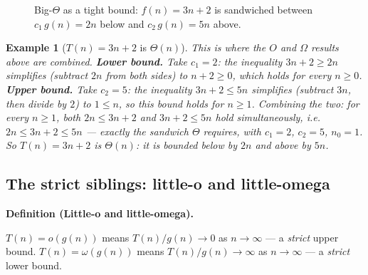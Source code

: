 \documentclass[11pt]{article}
\newtheorem{example}{Example}[section]
\newenvironment{definitionbox}[1]{%
  \par\noindent\textbf{Definition (#1).}\ \itshape
}{\par\vspace{0.3em}}
\begin{document}
\begin{figure}[h]
  \centering
  \caption{Big-$\Theta$ as a tight bound: $f(n)=3n+2$ is sandwiched between
  $c_1\,g(n)=2n$ below and $c_2\,g(n)=5n$ above.}
  \label{fig:bigtheta}
\end{figure}

\begin{example}[$T(n) = 3n + 2$ is $\Theta(n)$]
This is where the $O$ and $\Omega$ results above are combined. \textbf{Lower
bound.} Take $c_1 = 2$: the inequality $3n + 2 \geq 2n$ simplifies (subtract
$2n$ from both sides) to $n + 2 \geq 0$, which holds for every $n \geq 0$.
\textbf{Upper bound.} Take $c_2 = 5$: the inequality $3n + 2 \leq 5n$
simplifies (subtract $3n$, then divide by $2$) to $1 \leq n$, so this bound
holds for $n \geq 1$. Combining the two: for every $n \geq 1$, both
$2n \leq 3n + 2$ and $3n + 2 \leq 5n$ hold simultaneously, i.e.\
$2n \leq 3n+2 \leq 5n$ --- exactly the sandwich $\Theta$ requires, with
$c_1 = 2$, $c_2 = 5$, $n_0 = 1$. So $T(n) = 3n+2$ is $\Theta(n)$: it is
bounded below by $2n$ and above by $5n$.
\end{example}

\subsection{The strict siblings: little-o and little-omega}

\begin{definitionbox}{Little-o and little-omega}
$T(n) = o(g(n))$ means $T(n)/g(n) \to 0$ as $n \to \infty$ --- a
\emph{strict} upper bound. $T(n) = \omega(g(n))$ means $T(n)/g(n) \to
\infty$ as $n \to \infty$ --- a \emph{strict} lower bound.
\end{definitionbox}
\end{document}
